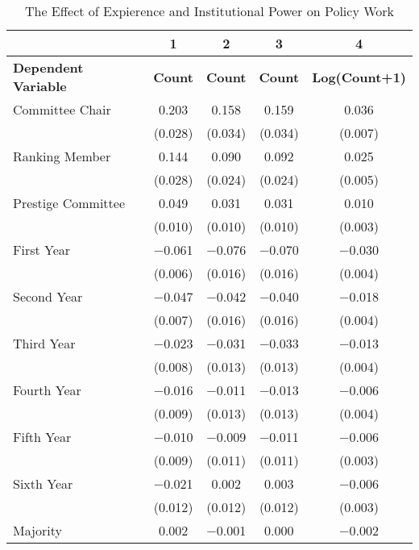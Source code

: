 \begin{table}

\caption{\label{tab:models_policy}The Effect of Expierence and Institutional Power on Policy Work}
\centering
\fontsize{11}{13}\selectfont
\begin{tabular}[t]{lcccc}
\toprule
  & 1 & 2 & 3 & 4\\
\midrule
\textbf{Dependent Variable} & \textbf{Count} & \textbf{Count} & \textbf{Count} & \textbf{Log(Count+1)}\\
\midrule
Committee Chair & \num{0.203} & \num{0.158} & \num{0.159} & \num{0.036}\\
 & (\num{0.028}) & (\num{0.034}) & (\num{0.034}) & (\num{0.007})\\
Ranking Member & \num{0.144} & \num{0.090} & \num{0.092} & \num{0.025}\\
 & (\num{0.028}) & (\num{0.024}) & (\num{0.024}) & (\num{0.005})\\
Prestige Committee & \num{0.049} & \num{0.031} & \num{0.031} & \num{0.010}\\
 & (\num{0.010}) & (\num{0.010}) & (\num{0.010}) & (\num{0.003})\\
First Year & \num{-0.061} & \num{-0.076} & \num{-0.070} & \num{-0.030}\\
 & (\num{0.006}) & (\num{0.016}) & (\num{0.016}) & (\num{0.004})\\
Second Year & \num{-0.047} & \num{-0.042} & \num{-0.040} & \num{-0.018}\\
 & (\num{0.007}) & (\num{0.016}) & (\num{0.016}) & (\num{0.004})\\
Third Year & \num{-0.023} & \num{-0.031} & \num{-0.033} & \num{-0.013}\\
 & (\num{0.008}) & (\num{0.013}) & (\num{0.013}) & (\num{0.004})\\
Fourth Year & \num{-0.016} & \num{-0.011} & \num{-0.013} & \num{-0.006}\\
 & (\num{0.009}) & (\num{0.013}) & (\num{0.013}) & (\num{0.004})\\
Fifth Year & \num{-0.010} & \num{-0.009} & \num{-0.011} & \num{-0.006}\\
 & (\num{0.009}) & (\num{0.011}) & (\num{0.011}) & (\num{0.003})\\
Sixth Year & \num{-0.021} & \num{0.002} & \num{0.003} & \num{-0.006}\\
 & (\num{0.012}) & (\num{0.012}) & (\num{0.012}) & (\num{0.003})\\
Majority & \num{0.002} & \num{-0.001} & \num{0.000} & \num{-0.002}\\

\end{tabular}
\end{table}
